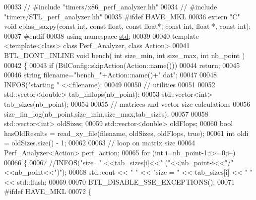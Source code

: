 \begin{DoxyCode}
00033 \textcolor{comment}{// #include "timers/x86\_perf\_analyzer.hh"}
00034 \textcolor{comment}{// #include "timers/STL\_perf\_analyzer.hh"}
00035 \textcolor{preprocessor}{#ifdef HAVE\_MKL}
00036 \textcolor{keyword}{extern} \textcolor{stringliteral}{"C"} \textcolor{keywordtype}{void} cblas\_saxpy(\textcolor{keyword}{const} \textcolor{keywordtype}{int}, \textcolor{keyword}{const} \textcolor{keywordtype}{float}, \textcolor{keyword}{const} \textcolor{keywordtype}{float}*, \textcolor{keyword}{const} \textcolor{keywordtype}{int}, \textcolor{keywordtype}{float} *, \textcolor{keyword}{const} \textcolor{keywordtype}{int});
00037 \textcolor{preprocessor}{#endif}
00038 \textcolor{keyword}{using namespace }\hyperlink{namespacestd}{std};
00039 
00040 \textcolor{keyword}{template} <\textcolor{keyword}{template}<\textcolor{keyword}{class}> \textcolor{keyword}{class }Perf\_Analyzer, \textcolor{keyword}{class }Action>
00041 BTL\_DONT\_INLINE \textcolor{keywordtype}{void} bench( \textcolor{keywordtype}{int} size\_min, \textcolor{keywordtype}{int} size\_max, \textcolor{keywordtype}{int} nb\_point )
00042 \{
00043   \textcolor{keywordflow}{if} (BtlConfig::skipAction(Action::name()))
00044     \textcolor{keywordflow}{return};
00045 
00046   \textcolor{keywordtype}{string} filename=\textcolor{stringliteral}{"bench\_"}+Action::name()+\textcolor{stringliteral}{".dat"};
00047 
00048   INFOS(\textcolor{stringliteral}{"starting "} <<filename);
00049 
00050   \textcolor{comment}{// utilities}
00051 
00052   std::vector<double> tab\_mflops(nb\_point);
00053   std::vector<int> tab\_sizes(nb\_point);
00054 
00055   \textcolor{comment}{// matrices and vector size calculations}
00056   size\_lin\_log(nb\_point,size\_min,size\_max,tab\_sizes);
00057 
00058   std::vector<int> oldSizes;
00059   std::vector<double> oldFlops;
00060   \textcolor{keywordtype}{bool} hasOldResults = read\_xy\_file(filename, oldSizes, oldFlops, \textcolor{keyword}{true});
00061   \textcolor{keywordtype}{int} oldi = oldSizes.size() - 1;
00062 
00063   \textcolor{comment}{// loop on matrix size}
00064   Perf\_Analyzer<Action> perf\_action;
00065   \textcolor{keywordflow}{for} (\textcolor{keywordtype}{int} i=nb\_point-1;i>=0;i--)
00066   \{
00067     \textcolor{comment}{//INFOS("size=" <<tab\_sizes[i]<<"   ("<<nb\_point-i<<"/"<<nb\_point<<")");}
00068     std::cout << \textcolor{stringliteral}{" "} << \textcolor{stringliteral}{"size = "} << tab\_sizes[i] << \textcolor{stringliteral}{"  "} << std::flush;
00069 
00070     BTL\_DISABLE\_SSE\_EXCEPTIONS();
00071 \textcolor{preprocessor}{    #ifdef HAVE\_MKL}
00072     \{

\end{DoxyCode}
